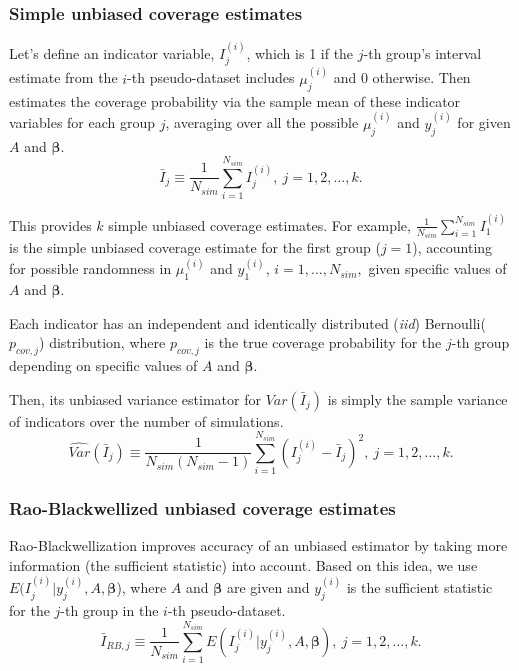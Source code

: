 \documentclass[article]{jss}
\begin{document}
\subsubsection{Simple unbiased coverage estimates}
Let's define an indicator variable, $I^{(i)}_{j}$, which is 1 if the $j$-th group's interval estimate from the $i$-th pseudo-dataset includes $\mu^{(i)}_{j}$ and 0 otherwise. Then  estimates the coverage probability via the sample mean of these indicator variables for each group $j$, averaging over all the possible $\mu^{(i)}_{j}$ and $y^{(i)}_{j}$ for given $A$ and $\boldsymbol{\beta}$. 
\begin{equation}
\bar{I}_{j}\equiv \frac{1}{N_{sim}}\sum_{i=1}^{N_{sim}}I^{(i)}_{j},~ j=1, 2, \ldots, k.
\end{equation}

This provides $k$ simple unbiased coverage estimates. For example, $\frac{1}{N_{sim}}\sum_{i=1}^{N_{sim}}I^{(i)}_{1}$ is the simple unbiased coverage estimate for the first group ($j=1$), accounting for possible randomness in $\mu^{(i)}_{1}$ and $y^{(i)}_{1}$, $i=1, \ldots, N_{sim},$ given specific values of $A$ and $\boldsymbol{\beta}$. 

Each indicator has an independent and identically distributed (\emph{iid}) Bernoulli($p_{cov, j}$) distribution, where $p_{cov, j}$ is the true coverage probability for the $j$-th group depending on specific values of $A$ and $\boldsymbol{\beta}$. 

Then, its unbiased variance estimator  for $Var(\bar{I}_{j})$ is simply the sample variance of indicators over the number of simulations.
\begin{equation}\label{svar}
\widehat{Var}(\bar{I}_{j})\equiv\frac{1}{N_{sim}(N_{sim}-1)}\sum_{i=1}^{N_{sim}}(I^{(i)}_{j}-\bar{I}_{j})^{2},~ j=1, 2, \ldots, k.
\end{equation}


\subsubsection{Rao-Blackwellized unbiased coverage estimates}
Rao-Blackwellization improves accuracy of an unbiased estimator by taking more information (the sufficient statistic) into account. Based on this idea, we use $E(I^{(i)}_{j}\vert y^{(i)}_{j}, A, \boldsymbol{\beta}$), where $A$ and $\boldsymbol{\beta}$ are given and $y^{(i)}_{j}$ is the sufficient statistic for the $j$-th group in the $i$-th pseudo-dataset. 
\begin{equation}\label{RB}
\bar{I}_{RB, j}\equiv \frac{1}{N_{sim}}\sum_{i=1}^{N_{sim}}E(I^{(i)}_{j}\vert y^{(i)}_{j}, A, \boldsymbol{\beta}),~ j=1, 2, \ldots, k.
\end{equation}
\end{document}
